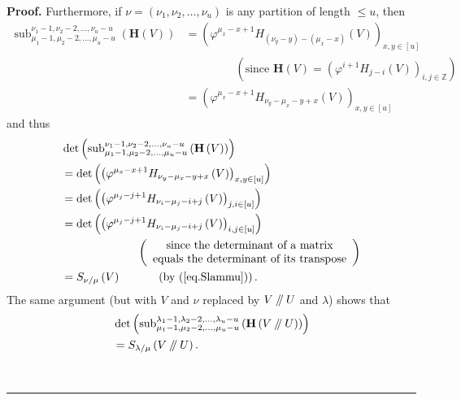 \documentclass[numbers=enddot,12pt,final,onecolumn,notitlepage]{scrartcl}%
\numberwithin{exer}{section}
\theoremstyle{definition}
\newenvironment{proof}[1][Proof]{\noindent\textbf{#1.} }{\ \rule{0.5em}{0.5em}}
\newcommand{\sslash}{\mathbin{/\mkern-5mu/}}
\theoremstyle{plainsl}
\begin{document}
\begin{proof}
Furthermore, if $\nu=\left(  \nu_{1},\nu_{2},\ldots,\nu_{u}\right)  $ is any
partition of length $\leq u$, then%
\begin{align*}
\operatorname*{sub}\nolimits_{\mu_{1}-1,\mu_{2}-2,\ldots,\mu_{u}-u}^{\nu
_{1}-1,\nu_{2}-2,\ldots,\nu_{u}-u}\left(  \mathbf{H}\left(  V\right)  \right)
&  =\left(  \varphi^{\mu_{x}-x+1}H_{\left(  \nu_{y}-y\right)  -\left(  \mu
_{x}-x\right)  }\left(  V\right)  \right)  _{x,y\in\left[  u\right]  }\\
&  \ \ \ \ \ \ \ \ \ \ \ \ \ \ \ \ \ \ \ \ \left(  \text{since }%
\mathbf{H}\left(  V\right)  =\left(  \varphi^{i+1}H_{j-i}\left(  V\right)
\right)  _{i,j\in\mathbb{Z}}\right) \\
&  =\left(  \varphi^{\mu_{x}-x+1}H_{\nu_{y}-\mu_{x}-y+x}\left(  V\right)
\right)  _{x,y\in\left[  u\right]  }%
\end{align*}
and thus%
\begin{align}
&  \det\left(  \operatorname*{sub}\nolimits_{\mu_{1}-1,\mu_{2}-2,\ldots
,\mu_{u}-u}^{\nu_{1}-1,\nu_{2}-2,\ldots,\nu_{u}-u}\left(  \mathbf{H}\left(
V\right)  \right)  \right) \nonumber\\
&  =\det\left(  \left(  \varphi^{\mu_{x}-x+1}H_{\nu_{y}-\mu_{x}-y+x}\left(
V\right)  \right)  _{x,y\in\left[  u\right]  }\right) \nonumber\\
&  =\det\left(  \left(  \varphi^{\mu_{j}-j+1}H_{\nu_{i}-\mu_{j}-i+j}\left(
V\right)  \right)  _{j,i\in\left[  u\right]  }\right) \nonumber\\
&  =\det\left(  \left(  \varphi^{\mu_{j}-j+1}H_{\nu_{i}-\mu_{j}-i+j}\left(
V\right)  \right)  _{i,j\in\left[  u\right]  }\right) \nonumber\\
&  \ \ \ \ \ \ \ \ \ \ \ \ \ \ \ \ \ \ \ \ \left(
\begin{array}
[c]{c}%
\text{since the determinant of a matrix}\\
\text{equals the determinant of its transpose}%
\end{array}
\right) \nonumber\\
&  =S_{\nu/\mu}\left(  V\right)  \ \ \ \ \ \ \ \ \ \ \left(  \text{by
(\ref{eq.Slammu})}\right)  . \label{pf.lem.Stilde.coproduct.8a}%
\end{align}
The same argument (but with $V$ and $\nu$ replaced by $V\sslash U$ and
$\lambda$) shows that%
\begin{align}
&  \det\left(  \operatorname*{sub}\nolimits_{\mu_{1}-1,\mu_{2}-2,\ldots
,\mu_{u}-u}^{\lambda_{1}-1,\lambda_{2}-2,\ldots,\lambda_{u}-u}\left(
\mathbf{H}\left(  V\sslash U\right)  \right)  \right) \nonumber\\
&  =S_{\lambda/\mu}\left(  V\sslash U\right)  .
\label{pf.lem.Stilde.coproduct.8b}%
\end{align}



\end{proof}
\end{document}
